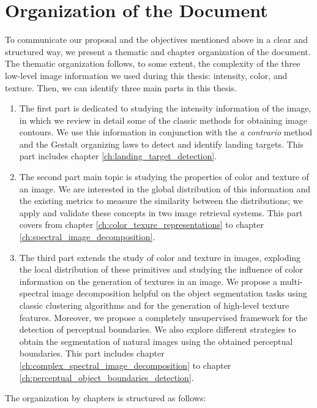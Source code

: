 \section*{Organization of the Document}

To communicate our proposal and the objectives mentioned above in a clear and structured way, we present a thematic and chapter organization of the document. The thematic organization follows, to some extent, the complexity of the three low-level image information we used during this thesis: intensity, color, and texture. Then, we can identify three main parts in this thesis.

\begin{enumerate}
	\item The first part is dedicated to studying the intensity information of the image, in which we review in detail some of the classic methods for obtaining image contours. We use this information in conjunction with the \textit{a contrario} method and the Gestalt organizing laws to detect and identify landing targets. This part includes chapter \ref{ch:landing_target_detection}. 
	\item The second part main topic is studying the properties of color and texture of an image. We are interested in the global distribution of this information and the existing metrics to measure the similarity between the distributions; we apply and validate these concepts in two image retrieval systems. This part covers from chapter \ref{ch:color_texure_representations} to chapter \ref{ch:spectral_image_decomposition}.
	\item The third part extends the study of color and texture in images, exploding the local distribution of these primitives and studying the influence of color information on the generation of textures in an image. We propose a multi-spectral image decomposition helpful on the object segmentation tasks using classic clustering algorithms and for the generation of high-level texture features. Moreover, we propose a completely unsupervised framework for the detection of perceptual boundaries. We also explore different strategies to obtain the segmentation of natural images using the obtained perceptual boundaries. This part includes chapter \ref{ch:complex_spectral_image_decomposition} to chapter \ref{ch:perceptual_object_boundaries_detection}.
\end{enumerate}

The organization by chapters is structured as follows:

